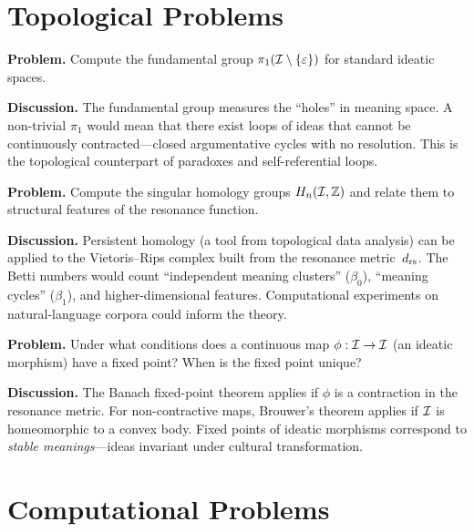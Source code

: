\section{Topological Problems}
\label{sec:open-topology}

\begin{game}
\label{op:fundamental-group}
\textbf{Problem.}  Compute the fundamental group
$\pi_1(\mathcal{I} \setminus \{\varepsilon\})$ for standard ideatic spaces.

\textbf{Discussion.}  The fundamental group measures the
``holes'' in meaning space.  A non-trivial $\pi_1$ would mean
that there exist loops of ideas that cannot be continuously
contracted---closed argumentative cycles with no resolution.
This is the topological counterpart of paradoxes and
self-referential loops.
\end{game}

\begin{game}
\label{op:homology}
\textbf{Problem.}  Compute the singular homology groups
$H_n(\mathcal{I}, \mathbb{Z})$ and relate them to structural features
of the resonance function.

\textbf{Discussion.}  Persistent homology (a tool from
topological data analysis) can be applied to the Vietoris--Rips
complex built from the resonance metric~$d_{\mathrm{rs}}$.  The Betti
numbers would count ``independent meaning clusters'' ($\beta_0$),
``meaning cycles'' ($\beta_1$), and higher-dimensional features.
Computational experiments on natural-language corpora could
inform the theory.
\end{game}

\begin{game}
\label{op:fixed-point}
\textbf{Problem.}  Under what conditions does a continuous map
$\phi : \mathcal{I} \to \mathcal{I}$ (an ideatic morphism) have a fixed point?
When is the fixed point unique?

\textbf{Discussion.}  The Banach fixed-point theorem applies if
$\phi$ is a contraction in the resonance metric.  For non-contractive
maps, Brouwer's theorem applies if $\mathcal{I}$ is homeomorphic to a
convex body.  Fixed points of ideatic morphisms correspond to
\emph{stable meanings}---ideas invariant under cultural
transformation.
\end{game}

\section{Computational Problems}
\label{sec:open-computation}

